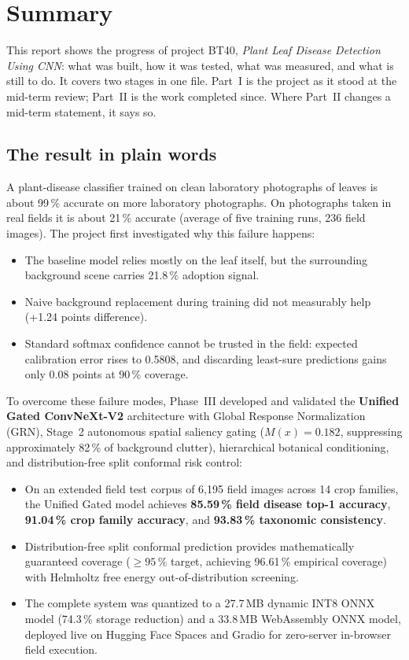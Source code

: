 \chapter*{Summary}
\thispagestyle{plain}

This report shows the progress of project BT40, \emph{Plant Leaf Disease Detection
Using CNN}: what was built, how it was tested, what was measured, and what is still
to do. It covers two stages in one file. Part~I is the project as it stood at the
mid-term review; Part~II is the work completed since. Where Part~II changes a
mid-term statement, it says so.

\section*{The result in plain words}

A plant-disease classifier trained on clean laboratory photographs of leaves is about
99\,\% accurate on more laboratory photographs. On photographs taken in real fields it
is about 21\,\% accurate (average of five training runs, 236 field images). The
project first investigated why this failure happens:
\begin{itemize}[leftmargin=1.4em,itemsep=2pt]
\item The baseline model relies mostly on the leaf itself, but the surrounding background scene carries 21.8\,\% adoption signal.
\item Naive background replacement during training did not measurably help (+1.24 points difference).
\item Standard softmax confidence cannot be trusted in the field: expected calibration error rises to 0.5808, and discarding least-sure predictions gains only 0.08 points at 90\,\% coverage.
\end{itemize}

To overcome these failure modes, Phase~III developed and validated the \textbf{Unified Gated ConvNeXt-V2} architecture with Global Response Normalization (GRN), Stage~2 autonomous spatial saliency gating ($M(x) = 0.182$, suppressing approximately 82\,\% of background clutter), hierarchical botanical conditioning, and distribution-free split conformal risk control:
\begin{itemize}[leftmargin=1.4em,itemsep=2pt]
\item On an extended field test corpus of 6{,}195 field images across 14 crop families, the Unified Gated model achieves \textbf{85.59\,\% field disease top-1 accuracy}, \textbf{91.04\,\% crop family accuracy}, and \textbf{93.83\,\% taxonomic consistency}.
\item Distribution-free split conformal prediction provides mathematically guaranteed coverage ($\ge 95\,\%$ target, achieving 96.61\,\% empirical coverage) with Helmholtz free energy out-of-distribution screening.
\item The complete system was quantized to a 27.7\,MB dynamic INT8 ONNX model (74.3\,\% storage reduction) and a 33.8\,MB WebAssembly ONNX model, deployed live on Hugging Face Spaces and Gradio for zero-server in-browser field execution.
\end{itemize}

